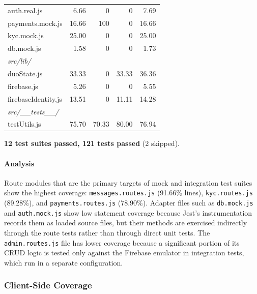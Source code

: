 \documentclass[11pt]{article}
\begin{document}
\begin{center}
\begin{longtable}{@{}p{4cm} r r r r@{}}
\quad auth.real.js & 6.66 & 0 & 0 & 7.69 \\
\quad payments.mock.js & 16.66 & 100 & 0 & 16.66 \\
\quad kyc.mock.js & 25.00 & 0 & 0 & 25.00 \\
\quad db.mock.js & 1.58 & 0 & 0 & 1.73 \\
\midrule
\multicolumn{5}{l}{\textit{src/lib/}} \\
\quad duoState.js & 33.33 & 0 & 33.33 & 36.36 \\
\quad firebase.js & 5.26 & 0 & 0 & 5.55 \\
\quad firebaseIdentity.js & 13.51 & 0 & 11.11 & 14.28 \\
\midrule
\multicolumn{5}{l}{\textit{src/\_\_tests\_\_/}} \\
\quad testUtils.js & 75.70 & 70.33 & 80.00 & 76.94 \\
\bottomrule
\end{longtable}
\end{center}

\textbf{12 test suites passed, 121 tests passed} (2 skipped).

\paragraph{Analysis}
Route modules that are the primary targets of mock and integration test suites
show the highest coverage: \texttt{messages.routes.js} (91.66\% lines),
\texttt{kyc.routes.js} (89.28\%), and \texttt{payments.routes.js} (78.90\%).
Adapter files such as \texttt{db.mock.js} and \texttt{auth.mock.js} show low
statement coverage because Jest's instrumentation records them as loaded source
files, but their methods are exercised indirectly through the route tests
rather than through direct unit tests. The \texttt{admin.routes.js} file has
lower coverage because a significant portion of its CRUD logic is tested only
against the Firebase emulator in integration tests, which run in a separate
configuration.

\subsubsection{Client-Side Coverage}
\end{document}
